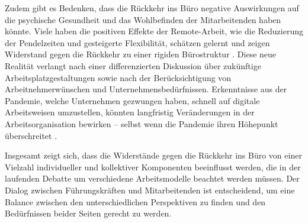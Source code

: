 Zudem gibt es Bedenken, dass die Rückkehr ins Büro negative Auswirkungen auf die psychische Gesundheit und das Wohlbefinden der Mitarbeitenden haben könnte. Viele haben die positiven Effekte der Remote-Arbeit, wie die Reduzierung der Pendelzeiten und gesteigerte Flexibilität, schätzen gelernt und zeigen Widerstand gegen die Rückkehr zu einer rigiden Bürostruktur \cite{file4}. Diese neue Realität verlangt nach einer differenzierten Diskussion über zukünftige Arbeitsplatzgestaltungen sowie nach der Berücksichtigung von Arbeitnehmerwünschen und Unternehmensbedürfnissen. Erkenntnisse aus der Pandemie, welche Unternehmen gezwungen haben, schnell auf digitale Arbeitsweisen umzustellen, könnten langfristig Veränderungen in der Arbeitsorganisation bewirken – selbst wenn die Pandemie ihren Höhepunkt überschreitet \cite{file2}.

Insgesamt zeigt sich, dass die Widerstände gegen die Rückkehr ins Büro von einer Vielzahl individueller und kollektiver Komponenten beeinflusst werden, die in der laufenden Debatte um verschiedene Arbeitsmodelle beachtet werden müssen. Der Dialog zwischen Führungskräften und Mitarbeitenden ist entscheidend, um eine Balance zwischen den unterschiedlichen Perspektiven zu finden und den Bedürfnissen beider Seiten gerecht zu werden.